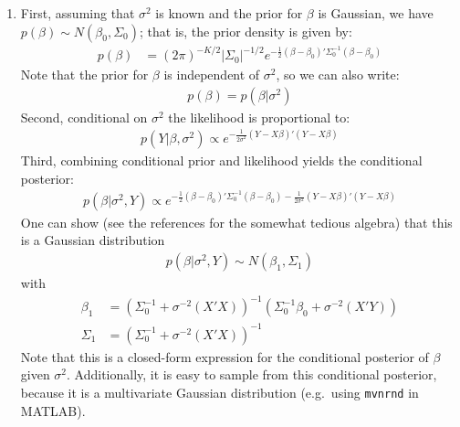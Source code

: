\begin{enumerate}
\item First, assuming that \(\sigma^2\) is known and the prior for \(\beta \) is Gaussian,
  we have \(p(\beta) \sim N(\beta_0,\Sigma_0)\); that is, the prior density is given by:
\begin{align*} 
p(\beta) &= {(2\pi)}^{-K/2} |\Sigma_0|^{-1/2} e^{-\frac{1}{2} (\beta - \beta_0)' \Sigma_0^{-1} (\beta - \beta_0)}
\end{align*}
Note that the prior for \(\beta \) is independent of \(\sigma^2\), so we can also write:
\begin{align*}
p(\beta) = p(\beta|\sigma^2)
\end{align*}
Second, conditional on \(\sigma^2\) the likelihood is proportional to:
\begin{align*}
p(Y|\beta,\sigma^2) \propto e^{-\frac{1}{2\sigma^2} (Y-X\beta)'(Y-X\beta)}
\end{align*}
Third, combining conditional prior and likelihood yields the conditional posterior:
\begin{align*}
p(\beta|\sigma^2,Y) \propto e^{-\frac{1}{2} (\beta-\beta_0)' \Sigma_0^{-1} (\beta-\beta_0) - \frac{1}{2\sigma^2} (Y-X\beta)'(Y-X\beta)}
\end{align*}
One can show (see the references for the somewhat tedious algebra) that this is a Gaussian distribution
\begin{align*}
p(\beta|\sigma^2,Y) \sim N(\beta_1,\Sigma_1)
\end{align*}
with
\begin{align*}
\beta_1 &= {\left( \Sigma_0^{-1} + \sigma^{-2} (X'X) \right)}^{-1} \left( \Sigma_0^{-1} \beta_0 + \sigma^{-2} (X'Y) \right)
\\
\Sigma_1 &= {\left( \Sigma_0^{-1} + \sigma^{-2} (X'X) \right)}^{-1}
\end{align*}
Note that this is a closed-form expression for the conditional posterior of \(\beta \) given \(\sigma^2\).
Additionally, it is easy to sample from this conditional posterior,
  because it is a multivariate Gaussian distribution (e.g.\ using \texttt{mvnrnd} in MATLAB).


\end{enumerate}
